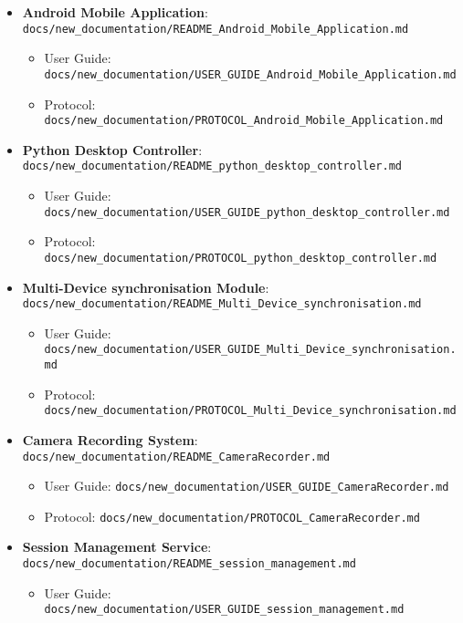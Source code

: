 \documentclass[11pt,a4paper]{report}
\begin{document}
{\begin{itemize}
    \item \textbf{Android Mobile Application}: \texttt{docs/new\_documentation/README\_Android\_Mobile\_Application.md}
    \begin{itemize}
        \item User Guide: \texttt{docs/new\_documentation/USER\_GUIDE\_Android\_Mobile\_Application.md}
        \item Protocol: \texttt{docs/new\_documentation/PROTOCOL\_Android\_Mobile\_Application.md}
    \end{itemize}
    \item \textbf{Python Desktop Controller}: \texttt{docs/new\_documentation/README\_python\_desktop\_controller.md}
    \begin{itemize}
        \item User Guide: \texttt{docs/new\_documentation/USER\_GUIDE\_python\_desktop\_controller.md}
        \item Protocol: \texttt{docs/new\_documentation/PROTOCOL\_python\_desktop\_controller.md}
    \end{itemize}
    \item \textbf{Multi-Device synchronisation Module}: \texttt{docs/new\_documentation/README\_Multi\_Device\_synchronisation.md}
    \begin{itemize}
        \item User Guide: \texttt{docs/new\_documentation/USER\_GUIDE\_Multi\_Device\_synchronisation.md}
        \item Protocol: \texttt{docs/new\_documentation/PROTOCOL\_Multi\_Device\_synchronisation.md}
    \end{itemize}
    \item \textbf{Camera Recording System}: \texttt{docs/new\_documentation/README\_CameraRecorder.md}
    \begin{itemize}
        \item User Guide: \texttt{docs/new\_documentation/USER\_GUIDE\_CameraRecorder.md}
        \item Protocol: \texttt{docs/new\_documentation/PROTOCOL\_CameraRecorder.md}
    \end{itemize}
    \item \textbf{Session Management Service}: \texttt{docs/new\_documentation/README\_session\_management.md}
    \begin{itemize}
        \item User Guide: \texttt{docs/new\_documentation/USER\_GUIDE\_session\_management.md}

\end{itemize}
\end{itemize}}
\end{document}
